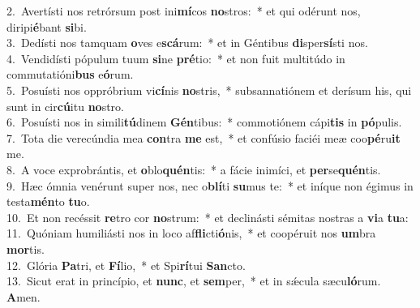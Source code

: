 {2.~}Avertísti nos retrórsum post ini\textbf{mí}cos \textbf{no}stros:~* et qui odérunt nos, diripi\textbf{é}bant \textbf{si}bi.\\
{3.~}Dedísti nos tamquam \textbf{o}ves e\textbf{scá}rum:~* et in Géntibus \textbf{di}sper\textbf{sí}sti nos.\\
{4.~}Vendidísti pópulum tuum \textbf{si}ne \textbf{pré}tio:~* et non fuit multitúdo in commutatióni\textbf{bus} e\textbf{ó}rum.\\
{5.~}Posuísti nos oppróbrium vi\textbf{cí}nis \textbf{no}stris,~* subsannatiónem et derísum his, qui sunt in cir\textbf{cú}itu \textbf{no}stro.\\
{6.~}Posuísti nos in simili\textbf{tú}dinem \textbf{Gén}tibus:~* commotiónem cápi\textbf{tis} in \textbf{pó}pulis.\\
{7.~}Tota die verecúndia mea \textbf{con}tra \textbf{me} est,~* et confúsio faciéi meæ coo\textbf{pé}ru\textbf{it} me.\\
{8.~}A voce exprobrántis, et \textbf{o}blo\textbf{quén}tis:~* a fácie inimíci, et \textbf{per}se\textbf{quén}tis.\\
{9.~}Hæc ómnia venérunt super nos, nec o\textbf{blí}ti \textbf{su}mus te:~* et iníque non égimus in testa\textbf{mén}to \textbf{tu}o.\\
{10.~}Et non recéssit \textbf{re}tro cor \textbf{no}strum:~* et declinásti sémitas nostras a \textbf{vi}a \textbf{tu}a:\\
{11.~}Quóniam humiliásti nos in loco af\textbf{fli}cti\textbf{ó}nis,~* et coopéruit nos \textbf{um}bra \textbf{mor}tis.\\
{12.~}Glória \textbf{Pa}tri, et \textbf{Fí}lio,~* et Spi\textbf{rí}tui \textbf{San}cto.\\
{13.~}Sicut erat in princípio, et \textbf{nunc}, et \textbf{sem}per,~* et in sǽcula sæcu\textbf{ló}rum. \textbf{A}men.\\

